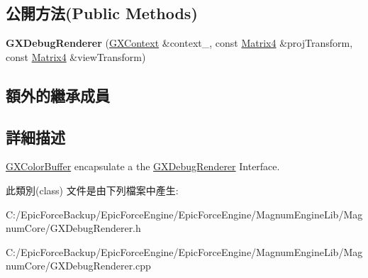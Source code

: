 \subsection*{公開方法(Public Methods)}
\begin{DoxyCompactItemize}
\item 
{\bfseries G\+X\+Debug\+Renderer} (\hyperlink{class_magnum_1_1_g_x_context}{G\+X\+Context} \&context\+\_\+, const \hyperlink{class_magnum_1_1_matrix4}{Matrix4} \&proj\+Transform, const \hyperlink{class_magnum_1_1_matrix4}{Matrix4} \&view\+Transform)\hypertarget{class_magnum_1_1_g_x_debug_renderer_a309ac314c444053c466709cb27a70b30}{}\label{class_magnum_1_1_g_x_debug_renderer_a309ac314c444053c466709cb27a70b30}

\end{DoxyCompactItemize}
\subsection*{額外的繼承成員}


\subsection{詳細描述}
\hyperlink{class_magnum_1_1_g_x_color_buffer}{G\+X\+Color\+Buffer} encapsulate a the \hyperlink{class_magnum_1_1_g_x_debug_renderer}{G\+X\+Debug\+Renderer} Interface. 

此類別(class) 文件是由下列檔案中產生\+:\begin{DoxyCompactItemize}
\item 
C\+:/\+Epic\+Force\+Backup/\+Epic\+Force\+Engine/\+Epic\+Force\+Engine/\+Magnum\+Engine\+Lib/\+Magnum\+Core/G\+X\+Debug\+Renderer.\+h\item 
C\+:/\+Epic\+Force\+Backup/\+Epic\+Force\+Engine/\+Epic\+Force\+Engine/\+Magnum\+Engine\+Lib/\+Magnum\+Core/G\+X\+Debug\+Renderer.\+cpp\end{DoxyCompactItemize}
